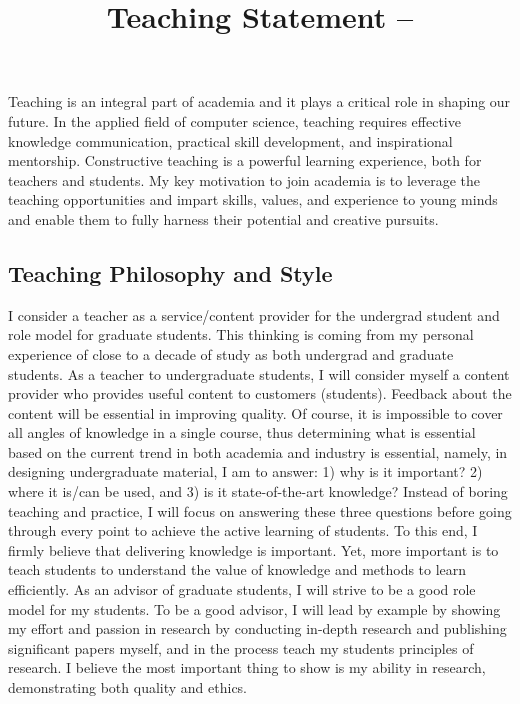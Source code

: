 \documentclass{NSF}
\begin{document}
\title{Teaching Statement -- }
\thispagestyle{empty}
Teaching is an integral part of academia and it plays a critical role in shaping our future. In the applied field of computer science, teaching requires effective knowledge communication, practical skill development, and inspirational mentorship.  Constructive teaching is a powerful learning experience, both for teachers and students. My key motivation to join academia is to leverage the teaching opportunities and impart skills, values, and experience to young minds and enable them to fully harness their potential and creative pursuits.  


\subsection*{Teaching Philosophy and Style}
I consider a teacher as a service/content provider for the undergrad student and role model for graduate students. This thinking is coming from my personal experience of close to a decade of study as both undergrad and graduate students. As a teacher to undergraduate students, I will consider myself a content provider who provides useful content to customers (students). Feedback about the content will be essential in improving quality. Of course, it is impossible to cover all angles of knowledge in a single course, thus determining what is essential based on the current trend in both academia and industry is essential, namely, in designing undergraduate material, I am to answer: 1) why is it important? 2) where it is/can be used, and 3) is it state-of-the-art knowledge? Instead of boring teaching and practice, I will focus on answering these three questions before going through every point to achieve the active learning of students. To this end, I firmly believe that delivering knowledge is important. Yet, more important is to teach students to understand the value of knowledge and methods to learn efficiently. As an advisor of graduate students, I will strive to be a good role model for my students. To be a good advisor, I will lead by example by showing my effort and passion in research by conducting in-depth research and publishing significant papers myself, and in the process teach my students principles of research. I believe the most important thing to show is my ability in research, demonstrating both quality and ethics. 

\vspace{-3mm}
\end{document}
